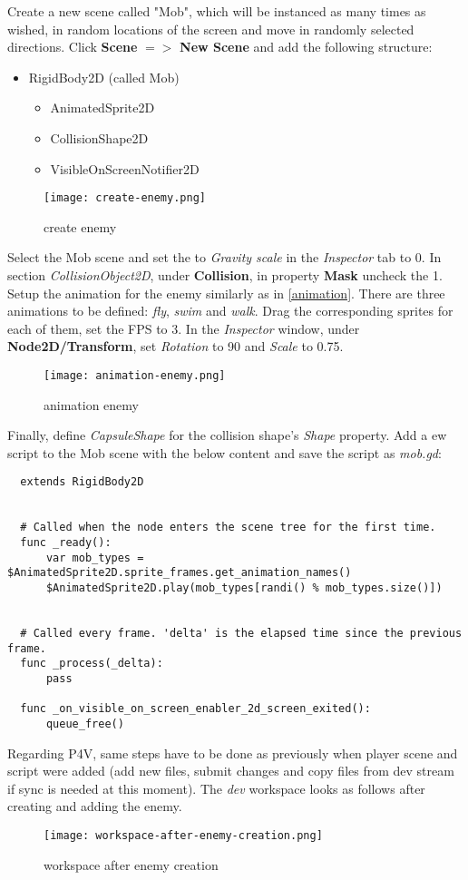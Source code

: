   Create a new scene called "Mob", which will be instanced as many times as wished, in random locations of the screen and 
  move in randomly selected directions. Click \textbf{Scene} {$=>$} \textbf{New Scene} and add the following structure:
  \begin{itemize}
    \item RigidBody2D (called Mob)
      \begin{itemize}
        \item AnimatedSprite2D
        \item CollisionShape2D
        \item VisibleOnScreenNotifier2D
      \end{itemize}
  \end{itemize}
  \begin{figure}[H]
    \centering
    \texttt{[image: create-enemy.png]}
    \caption{create enemy}
    \label{fig:create-enemy}
  \end{figure}
Select the Mob scene and set the to \textit{Gravity scale} in the \textit{Inspector} tab to 0. 
In section \textit{CollisionObject2D}, under \textbf{Collision}, in property \textbf{Mask} uncheck the 1.
Setup the animation for the enemy similarly as in \ref{animation}. There are three animations to be defined:
\textit{fly}, \textit{swim} and \textit{walk}. Drag the corresponding sprites for each of them, set the FPS to 3.
In the \textit{Inspector} window, under \textbf{Node2D/Transform}, set \textit{Rotation} to 90 and \textit{Scale}
to 0.75.
\begin{figure}[H]
  \centering
  \texttt{[image: animation-enemy.png]}
  \caption{animation enemy}
  \label{fig:animation-enemy}
\end{figure}
Finally, define \textit{CapsuleShape} for the collision shape's \textit{Shape} property. Add a ew script to the Mob scene
with the below content and save the script as \textit{mob.gd}:
\begin{verbatim}
  extends RigidBody2D


  # Called when the node enters the scene tree for the first time.
  func _ready():
	  var mob_types = $AnimatedSprite2D.sprite_frames.get_animation_names()
	  $AnimatedSprite2D.play(mob_types[randi() % mob_types.size()])


  # Called every frame. 'delta' is the elapsed time since the previous frame.
  func _process(_delta):
	  pass

  func _on_visible_on_screen_enabler_2d_screen_exited():
	  queue_free()
\end{verbatim}
Regarding P4V, same steps have to be done as previously when player scene and script were added (add new files,
submit changes and copy files from dev stream if sync is needed at this moment). The \textit{dev} workspace looks as 
follows after creating and adding the enemy.
\begin{figure}[H]
  \centering
  \texttt{[image: workspace-after-enemy-creation.png]}
  \caption{workspace after enemy creation}
  \label{fig:workspace-after-enemy-creation}
\end{figure}